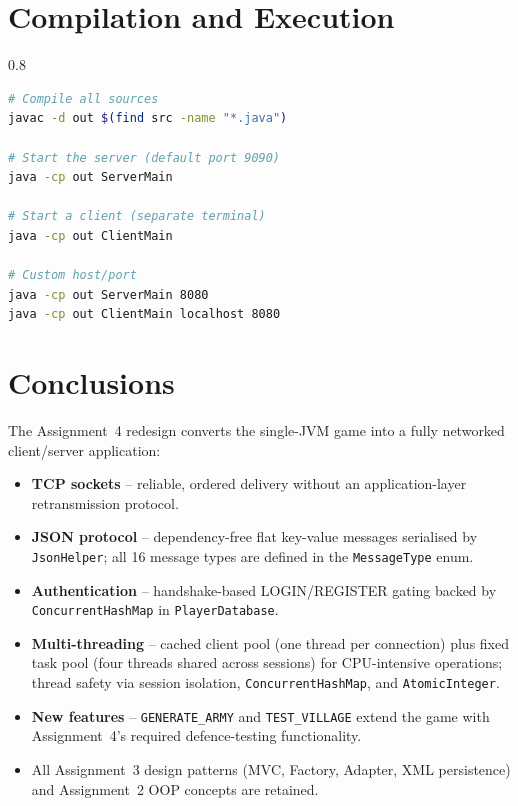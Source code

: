 \documentclass[format=acmsmall, review=false, screen=true]{acmart}
\begin{document}
\section{Compilation and Execution}

\begin{spacing}{0.8}
\begin{lstlisting}[language=bash, caption={Compilation and execution.}, label=lst:compile]
# Compile all sources
javac -d out $(find src -name "*.java")

# Start the server (default port 9090)
java -cp out ServerMain

# Start a client (separate terminal)
java -cp out ClientMain

# Custom host/port
java -cp out ServerMain 8080
java -cp out ClientMain localhost 8080
\end{lstlisting}
\end{spacing}

\section{Conclusions}

The Assignment~4 redesign converts the single-JVM game into a fully networked
client/server application:

\begin{itemize}[noitemsep]
  \item \textbf{TCP sockets} -- reliable, ordered delivery without an
        application-layer retransmission protocol.
  \item \textbf{JSON protocol} -- dependency-free flat key-value messages
        serialised by \texttt{JsonHelper}; all 16 message types are defined in
        the \texttt{MessageType} enum.
  \item \textbf{Authentication} -- handshake-based LOGIN/REGISTER gating backed
        by \texttt{ConcurrentHashMap} in \texttt{PlayerDatabase}.
  \item \textbf{Multi-threading} -- cached client pool (one thread per
        connection) plus fixed task pool (four threads shared across sessions)
        for CPU-intensive operations; thread safety via session isolation,
        \texttt{ConcurrentHashMap}, and \texttt{AtomicInteger}.
  \item \textbf{New features} -- \texttt{GENERATE\_ARMY} and
        \texttt{TEST\_VILLAGE} extend the game with Assignment~4's required
        defence-testing functionality.
  \item All Assignment~3 design patterns (MVC, Factory, Adapter, XML
        persistence) and Assignment~2 OOP concepts are retained.
\end{itemize}
\end{document}
